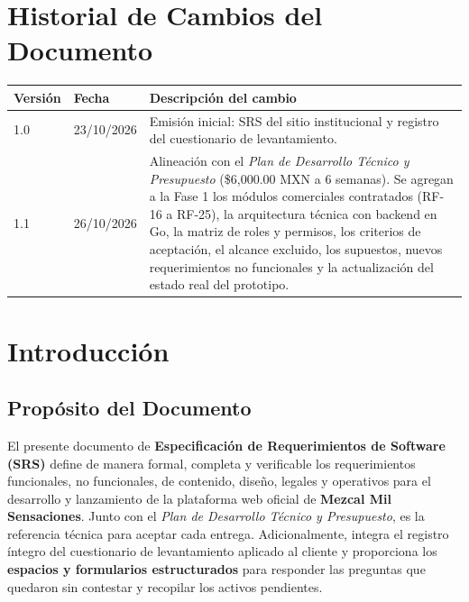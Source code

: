 \documentclass[11pt,letterpaper]{article}
\begin{document}
\section*{Historial de Cambios del Documento}

\renewcommand{\arraystretch}{1.35}
\begin{tabularx}{\linewidth}{@{} l l >{\raggedright\arraybackslash}X @{}}
\toprule
\textbf{Versión} & \textbf{Fecha} & \textbf{Descripción del cambio} \\
\midrule
1.0 & 23/10/2026 & Emisión inicial: SRS del sitio institucional y registro del cuestionario de levantamiento. \\
\midrule
1.1 & 26/10/2026 & Alineación con el \textit{Plan de Desarrollo Técnico y Presupuesto} (\$6,000.00 MXN a 6 semanas). Se agregan a la Fase 1 los módulos comerciales contratados (RF-16 a RF-25), la arquitectura técnica con backend en Go, la matriz de roles y permisos, los criterios de aceptación, el alcance excluido, los supuestos, nuevos requerimientos no funcionales y la actualización del estado real del prototipo. \\
\bottomrule
\end{tabularx}

\section{Introducción}

\subsection{Propósito del Documento}
El presente documento de \textbf{Especificación de Requerimientos de Software (SRS)} define de manera formal, completa y verificable los requerimientos funcionales, no funcionales, de contenido, diseño, legales y operativos para el desarrollo y lanzamiento de la plataforma web oficial de \textbf{Mezcal Mil Sensaciones}. Junto con el \textit{Plan de Desarrollo Técnico y Presupuesto}, es la referencia técnica para aceptar cada entrega. Adicionalmente, integra el registro íntegro del cuestionario de levantamiento aplicado al cliente y proporciona los \textbf{espacios y formularios estructurados} para responder las preguntas que quedaron sin contestar y recopilar los activos pendientes.
\end{document}
